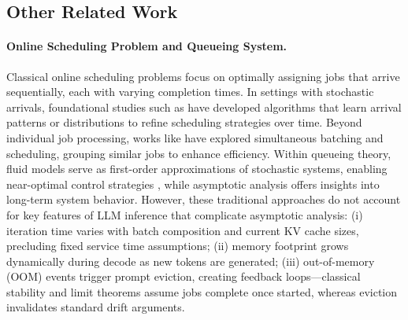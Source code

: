 \subsection{Other Related Work}

\paragraph*{Online Scheduling Problem and Queueing System.} 
Classical online scheduling problems focus on optimally assigning jobs that arrive sequentially, each with varying completion times. In settings with stochastic arrivals, foundational studies such as \cite{devanur2009adwords,vee2010optimal,cole2014sample,balkanski2016power,lattanzi2020online} have developed algorithms that learn arrival patterns or distributions to refine scheduling strategies over time. Beyond individual job processing, works like \cite{im2013online,lucier2013efficient,liu2015online,li2020online} have explored simultaneous batching and scheduling, grouping similar jobs to enhance efficiency. Within queueing theory, fluid models serve as first-order approximations of stochastic systems, enabling near-optimal control strategies \cite{mandelbaum1998strong,maglaras2000discrete,bauerle2002optimal,liu2011network}, while asymptotic analysis offers insights into long-term system behavior. However, these traditional approaches do not account for key features of LLM inference that complicate asymptotic analysis: (i) iteration time varies with batch composition and current KV cache sizes, precluding fixed service time assumptions; (ii) memory footprint grows dynamically during decode as new tokens are generated; (iii) out-of-memory (OOM) events trigger prompt eviction, creating feedback loops---classical stability and limit theorems assume jobs complete once started, whereas eviction invalidates standard drift arguments.

